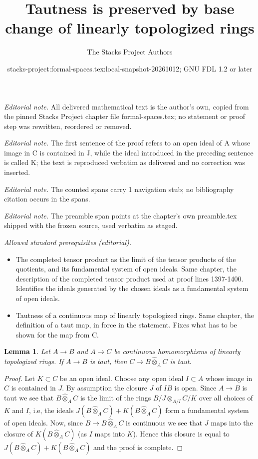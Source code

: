 \documentclass{stacks-project}
\title{Tautness is preserved by base change of linearly topologized rings}
\author{The Stacks Project Authors}
\date{stacks-project:formal-spaces.tex:local-snapshot-20261012; GNU FDL 1.2 or later}
\theoremstyle{plain}
\newtheorem{lemma}[subsection]{Lemma}
\theoremstyle{definition}
\theoremstyle{remark}
\numberwithin{equation}{subsection}
\begin{document}
\maketitle
\noindent\textit{Editorial note.} All delivered mathematical text is the author's own, copied from the pinned Stacks Project chapter file formal-spaces.tex; no statement or proof step was rewritten, reordered or removed.\par\medskip
\noindent\textit{Editorial note.} The first sentence of the proof refers to an open ideal of A whose image in C is contained in J, while the ideal introduced in the preceding sentence is called K; the text is reproduced verbatim as delivered and no correction was inserted.\par\medskip
\noindent\textit{Editorial note.} The counted spans carry 1 navigation stub; no bibliography citation occurs in the spans.\par\medskip
\noindent\textit{Editorial note.} The preamble span points at the chapter's own preamble.tex shipped with the frozen source, used verbatim as staged.\par\medskip
\noindent\textit{Allowed standard prerequisites (editorial).}\begin{itemize}
\item The completed tensor product as the limit of the tensor products of the quotients, and its fundamental system of open ideals. Same chapter, the description of the completed tensor product used at proof lines 1397-1400. Identifies the ideals generated by the chosen ideals as a fundamental system of open ideals.
\item Tautness of a continuous map of linearly topologized rings. Same chapter, the definition of a taut map, in force in the statement. Fixes what has to be shown for the map from C.
\end{itemize}\medskip
\begin{lemma}
\label{lemma-base-change-taut}
Let $A \to B$ and $A \to C$ be continuous homomorphisms of
linearly topologized rings. If $A \to B$ is taut, then
$C \to B \widehat{\otimes}_A C$ is taut.
\end{lemma}

\begin{proof}
Let $K \subset C$ be an open ideal. Choose any open ideal $I \subset A$
whose image in $C$ is contained in $J$. By assumption the closure $J$
of $IB$ is open. Since $A \to B$ is taut we see that
$B \widehat{\otimes}_A C$ is the limit of the rings $B/J \otimes_{A/I} C/K$
over all choices of $K$ and $I$, i.e,
the ideals $J(B \widehat{\otimes}_A C) + K(B \widehat{\otimes}_A C)$
form a fundamental system of open ideals. Now,
since $B \to B \widehat{\otimes}_A C$ is continuous we see
that $J$ maps into the closure of $K(B \widehat{\otimes}_A C)$
(as $I$ maps into $K$). Hence this closure is equal to
$J(B \widehat{\otimes}_A C) + K(B \widehat{\otimes}_A C)$
and the proof is complete.
\end{proof}
\end{document}
